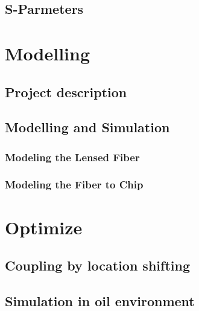 \section{S-Parmeters}


\chapter{Modelling}
\label{chp:model}
%
\section{Project description}
%
\section{Modelling and Simulation}
%
\subsection{Modeling the Lensed Fiber}
\label{sect:model_model_model_TLF}
%
\subsection{Modeling the Fiber to Chip}
\label{sect:model_model_fiber2chip}
%

%
\chapter{Optimize}
\label{chp:optim}
%

\section{Coupling by location shifting}
\label{sect:optim_shift}
%

\section{Simulation in oil environment}
%

